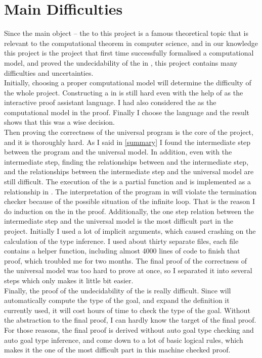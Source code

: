\section{Main Difficulties}
Since the main object -- the  to this project is a famous theoretical topic that is relevant to the computational theorem in computer science, 
and in our knowledge this project is the project that first time successfully formalised a  computational model, and proved the undecidability of the  in \Agda,
this project contains many difficulties and uncertainties.\\
Initially, choosing a proper computational model will determine the difficulty of the whole project.
Constructing a  in \Agda is still hard even with the help of \Agda as the interactive proof assistant language.
I had also considered the  as the computational model in the proof.
Finally I choose the \WHILE language and the result shows that this was a wise decision.\\
Then proving the correctness of the universal \WHILE program is the core of the project, and it is thoroughly hard.
As I said in \ref{summary} I found the intermediate step between the \WHILE program and the universal \WHILE model.
In addition, even with the intermediate step, finding the relationships between \WHILE and the intermediate step, and the relationships between the intermediate step and the universal \WHILE model are still difficult.
The execution of the  is a partial function and is implemented as a relationship in .
The interpretation of the  program in \Agda will violate the termination checker because of the possible situation of the infinite  loop.
That is the reason I do induction on the  in the proof.
Additionally, the one step relation between the intermediate step and the universal \WHILE model is the most difficult part in the project.
Initially I used a lot of implicit arguments, which caused \Agda crashing on the calculation of the type inference.
I used about thirty separate files, each file contains a helper function, including almost 4000 lines of code to finish that proof, which troubled me for two months.
The final proof of the correctness of the universal \WHILE model was too hard to prove at once, so I separated it into several steps which only makes it little bit easier.\\
Finally, the proof of the undecidability of the  is really difficult.
Since \Agda will automatically compute the type of the goal, and expand the definition it currently used, it will cost hours of time to check the type of the goal.
Without the abstraction to the final proof, I can hardly know the target of the final proof.
For those reasons, the final proof is derived without auto goal type checking and auto goal type inference, and come down to a lot of basic logical rules, which makes it the one of the most difficult part in this machine checked proof.

